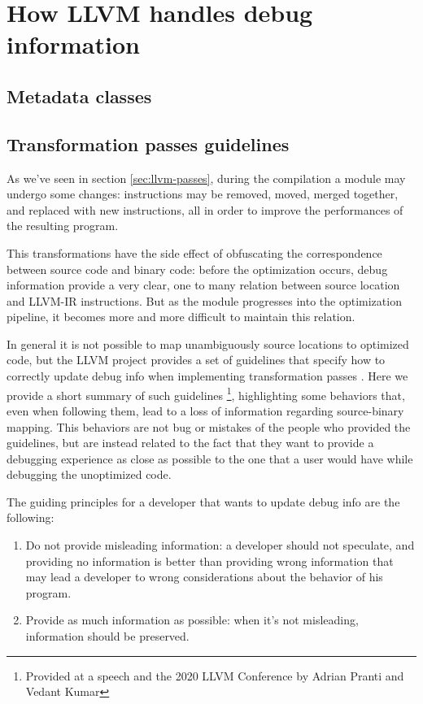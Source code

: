 \section{How LLVM handles debug information\label{sec:llvm-dbg}}

\subsection{Metadata classes}
\subsection{Transformation passes guidelines}
As we've seen in section \ref{sec:llvm-passes}, during the compilation a module may undergo some changes: instructions may be removed, moved, merged together, and replaced with new instructions, all in order to improve the performances of the resulting program. \par 
This transformations have the side effect of obfuscating the correspondence between source code and binary code: before the optimization occurs, debug information provide a very clear, one to many relation between source location and LLVM-IR instructions. But as the module progresses into the optimization pipeline, it becomes more and more difficult to maintain this relation. \par
In general it is not possible to map unambiguously source locations to optimized code, but the LLVM project provides a set of guidelines that specify how to correctly update debug info when implementing transformation passes \cite{llvm-guidelines}. \newline
Here we provide a short summary of such guidelines \footnote{Provided at a speech and the 2020 LLVM Conference by Adrian Pranti and Vedant Kumar}, highlighting some behaviors that, even when following them, lead to a loss of information regarding source-binary mapping. This behaviors are not bug or mistakes of the people who provided the guidelines, but are instead related to the fact that they want to provide a debugging experience as close as possible to the one that a user would have while debugging the unoptimized code. \par 
The guiding principles for a developer that wants to update debug info are the following:
\begin{enumerate}
\item Do not provide misleading information: a developer should not speculate, and providing no information is better than providing wrong information that may lead a developer to wrong considerations about the behavior of his program.
\item Provide as much information as possible: when it's not misleading, information should be preserved. 
\end{enumerate}
